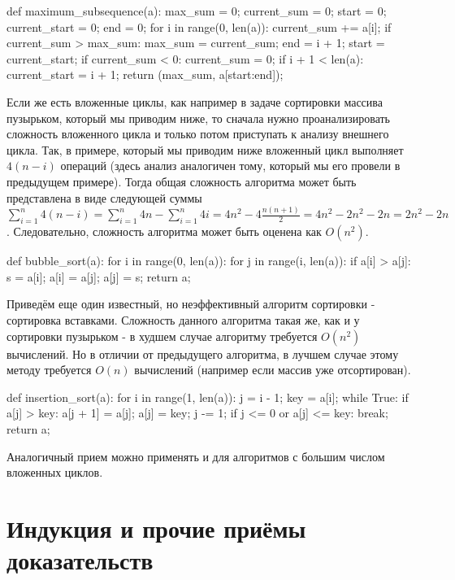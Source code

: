 \begin{python}
def maximum_subsequence(a):
	max_sum = 0;
	current_sum = 0;
	start = 0;
	current_start = 0;
	end = 0;
	for i in range(0, len(a)):
		current_sum += a[i];
		if current_sum > max_sum:
			max_sum = current_sum;
			end = i + 1;
			start = current_start;
		if current_sum < 0:
			current_sum = 0;
			if i + 1 < len(a):
				current_start = i + 1;
	return (max_sum, a[start:end]);
\end{python}

Если же есть вложенные циклы, как например в задаче сортировки массива пузырьком, 
который мы приводим ниже, то сначала нужно проанализировать сложность 
вложенного цикла и только потом приступать к анализу внешнего цикла. Так, в примере,
который мы приводим ниже вложенный цикл выполняет $4(n-i)$ операций 
(здесь анализ аналогичен тому, который мы его 
провели в предыдущем примере). Тогда общая сложность
алгоритма может быть представлена в виде следующей суммы 
$\sum_{i=1}^n4(n-i) = \sum_{i=1}^n4n - \sum_{i=1}^n4i = 4n^2 - 4\frac{n(n+1)}{2} = 4n^2-2n^2 - 2n=2n^2 - 2n$.
Следовательно, сложность алгоритма может быть оценена как $O(n^2)$.

\begin{python}
def bubble_sort(a):
	for i in range(0, len(a)):
		for j in range(i, len(a)):
			if a[i] > a[j]:
				s = a[i];
				a[i] = a[j];
				a[j] = s;
	return a;
\end{python}

Приведём еще один известный, но неэффективный алгоритм сортировки - сортировка вставками. Сложность
данного алгоритма такая же, как и у сортировки пузырьком - в худшем случае алгоритму требуется $O(n^2)$
вычислений. Но в отличии от предыдущего алгоритма, в лучшем случае этому методу требуется $O(n)$ вычислений
(например если массив уже отсортирован).

\begin{python}
def insertion_sort(a):
	for i in range(1, len(a)):
		j = i - 1;
		key = a[i];
		while True:
			if a[j] > key:
				a[j + 1] = a[j];				
				a[j] = key;
				j -= 1;
			if j <= 0 or a[j] <= key:
				break;
	return a;
\end{python}


Аналогичный прием можно применять и для алгоритмов с большим числом вложенных
циклов.

\section{Индукция и прочие приёмы доказательств}

